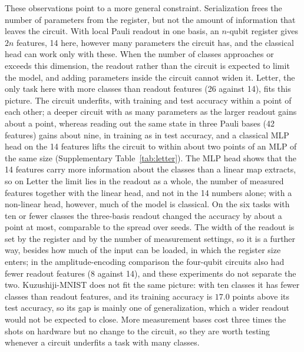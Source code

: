 \documentclass[11pt]{article}
\begin{document}
These observations point to a more general constraint. Serialization frees the number of parameters from the register, but not the amount of information that leaves the circuit. With local Pauli readout in one basis, an $n$-qubit register gives $2n$ features, 14 here, however many parameters the circuit has, and the classical head can work only with these. When the number of classes approaches or exceeds this dimension, the readout rather than the circuit is expected to limit the model, and adding parameters inside the circuit cannot widen it. Letter, the only task here with more classes than readout features (26 against 14), fits this picture. The circuit underfits, with training and test accuracy within a point of each other; a deeper circuit with as many parameters as the larger readout gains about a point, whereas reading out the same state in three Pauli bases (42 features) gains about nine, in training as in test accuracy, and a classical MLP head on the 14 features lifts the circuit to within about two points of an MLP of the same size (Supplementary Table~\ref{tab:letter}). The MLP head shows that the 14 features carry more information about the classes than a linear map extracts, so on Letter the limit lies in the readout as a whole, the number of measured features together with the linear head, and not in the 14 numbers alone; with a non-linear head, however, much of the model is classical. On the six tasks with ten or fewer classes the three-basis readout changed the accuracy by about a point at most, comparable to the spread over seeds. The width of the readout is set by the register and by the number of measurement settings, so it is a further way, besides how much of the input can be loaded, in which the register size enters; in the amplitude-encoding comparison the four-qubit circuits also had fewer readout features (8 against 14), and these experiments do not separate the two. Kuzushiji-MNIST does not fit the same picture: with ten classes it has fewer classes than readout features, and its training accuracy is $17.0$ points above its test accuracy, so its gap is mainly one of generalization, which a wider readout would not be expected to close. More measurement bases cost three times the shots on hardware but no change to the circuit, so they are worth testing whenever a circuit underfits a task with many classes.
\end{document}
